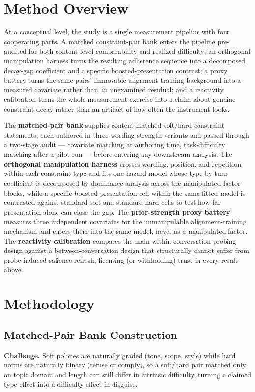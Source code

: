 \documentclass[11pt]{article}
\begin{document}
\section{Method Overview}

At a conceptual level, the study is a single measurement pipeline with four cooperating parts. A matched constraint-pair bank enters the pipeline pre-audited for both content-level comparability and realized difficulty; an orthogonal manipulation harness turns the resulting adherence sequence into a decomposed decay-gap coefficient and a specific boosted-presentation contrast; a proxy battery turns the same pairs' immovable alignment-training background into a measured covariate rather than an unexamined residual; and a reactivity calibration turns the whole measurement exercise into a claim about genuine constraint decay rather than an artifact of how often the instrument looks.

The \textbf{matched-pair bank} supplies content-matched soft/hard constraint statements, each authored in three wording-strength variants and passed through a two-stage audit --- covariate matching at authoring time, task-difficulty matching after a pilot run --- before entering any downstream analysis. The \textbf{orthogonal manipulation harness} crosses wording, position, and repetition within each constraint type and fits one hazard model whose type-by-turn coefficient is decomposed by dominance analysis across the manipulated factor blocks, while a specific boosted-presentation cell within the same fitted model is contrasted against standard-soft and standard-hard cells to test how far presentation alone can close the gap. The \textbf{prior-strength proxy battery} measures three independent covariates for the unmanipulable alignment-training mechanism and enters them into the same model, never as a manipulated factor. The \textbf{reactivity calibration} compares the main within-conversation probing design against a between-conversation design that structurally cannot suffer from probe-induced salience refresh, licensing (or withholding) trust in every result above.

\section{Methodology}

\subsection{Matched-Pair Bank Construction}
\textbf{Challenge.} Soft policies are naturally graded (tone, scope, style) while hard norms are naturally binary (refuse or comply), so a soft/hard pair matched only on topic domain and length can still differ in intrinsic difficulty, turning a claimed type effect into a difficulty effect in disguise.
\end{document}
